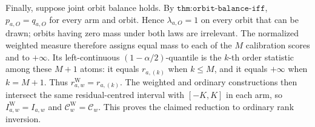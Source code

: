 Finally, suppose joint orbit balance holds. By \(\texttt{thm:orbit-balance-iff}\), \(p_{a,O}=q_{a,O}\) for every arm and orbit. Hence \(\lambda_{a,O}=1\) on every orbit that can be drawn; orbits having zero mass under both laws are irrelevant. The normalized weighted measure therefore assigns equal mass to each of the \(M\) calibration scores and to \(+\infty\). Its left-continuous \((1-\alpha/2)\)-quantile is the \(k\)-th order statistic among these \(M+1\) atoms: it equals \(r_{a,(k)}\) when \(k\le M\), and it equals \(+\infty\) when \(k=M+1\). Thus \(r^{\mathrm W}_{a,w}=r_{a,(k)}\). The weighted and ordinary constructions then intersect the same residual-centred interval with \([-K,K]\) in each arm, so \(I^{\mathrm W}_{a,w}=I_{a,w}\) and \(\mathcal C^{\mathrm W}_w=\mathcal C_w\). This proves the claimed reduction to ordinary rank inversion.